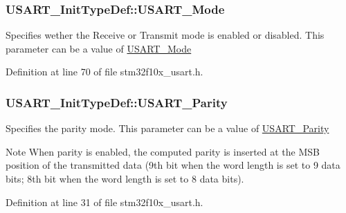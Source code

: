 \subsubsection[{\texorpdfstring{U\+S\+A\+R\+T\+\_\+\+Mode}{USART_Mode}}]{ U\+S\+A\+R\+T\+\_\+\+Init\+Type\+Def\+::\+U\+S\+A\+R\+T\+\_\+\+Mode}\hypertarget{struct_u_s_a_r_t___init_type_def_a7d944d35d7d1fc79a63f249615148584}{}\label{struct_u_s_a_r_t___init_type_def_a7d944d35d7d1fc79a63f249615148584}
Specifies wether the Receive or Transmit mode is enabled or disabled. This parameter can be a value of \hyperlink{group___u_s_a_r_t___mode}{U\+S\+A\+R\+T\+\_\+\+Mode} 

Definition at line 70 of file stm32f10x\+\_\+usart.\+h.

\subsubsection[{\texorpdfstring{U\+S\+A\+R\+T\+\_\+\+Parity}{USART_Parity}}]{ U\+S\+A\+R\+T\+\_\+\+Init\+Type\+Def\+::\+U\+S\+A\+R\+T\+\_\+\+Parity}\hypertarget{struct_u_s_a_r_t___init_type_def_adc923fbe7f5e9e020b1c076b8bfd729d}{}\label{struct_u_s_a_r_t___init_type_def_adc923fbe7f5e9e020b1c076b8bfd729d}
Specifies the parity mode. This parameter can be a value of \hyperlink{group___u_s_a_r_t___parity}{U\+S\+A\+R\+T\+\_\+\+Parity} \begin{DoxyNote}{Note}
When parity is enabled, the computed parity is inserted at the M\+SB position of the transmitted data (9th bit when the word length is set to 9 data bits; 8th bit when the word length is set to 8 data bits). 
\end{DoxyNote}


Definition at line 31 of file stm32f10x\+\_\+usart.\+h.

